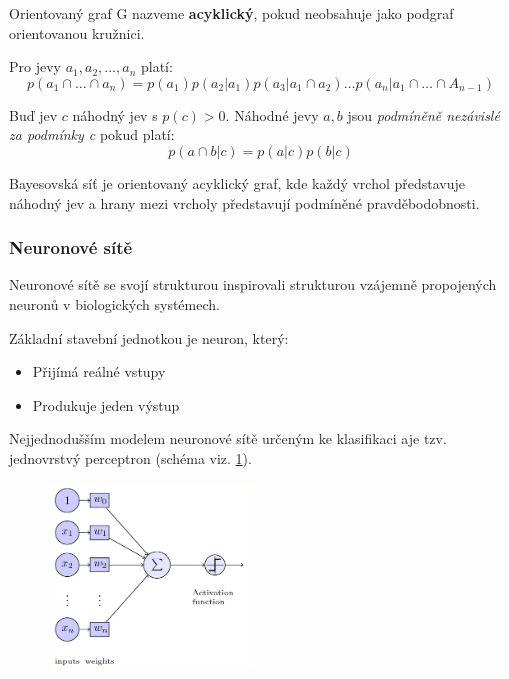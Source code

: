 \begin{definition}
    Orientovaný graf G nazveme \textbf{acyklický}, pokud neobsahuje jako podgraf orientovanou kružnici.
    \end{definition}

    \begin{lemma}
        Pro jevy $a_1, a_2, \hdots, a_n$ platí: 
        $$p(a_1 \cap \hdots \cap a_n) = p(a_1)p(a_2|a_1)p(a_3|a_1 \cap a_2)\hdots p(a_n| a_1 \cap \hdots \cap A_{n-1}) $$
        \end{lemma}

        \begin{definition}
            Buď jev $c$ náhodný jev s $p(c) > 0 $. Náhodné jevy $a, b$ jsou \textit{podmíněně nezávislé za podmínky c} pokud platí: 
            $$p(a \cap b|c) = p(a|c)p(b|c)$$
            \end{definition}
Bayesovská síť je  orientovaný acyklický graf, kde každý vrchol představuje náhodný jev a hrany mezi vrcholy představují podmíněné pravděbodobnosti. 

\subsubsection{Neuronové sítě}
Neuronové sítě se svojí strukturou inspirovali strukturou vzájemně propojených neuronů v biologických systémech. 

Základní stavební jednotkou je neuron, který:
\begin{itemize}
    \item Přijímá reálné vstupy
    \item Produkuje jeden výstup
\end{itemize}

Nejjednodušším modelem neuronové sítě určeným ke klasifikaci aje tzv. jednovrstvý perceptron (schéma viz. \ref*{fig:perceptron}).

\begin{figure}[h]
    \centering
    \includegraphics[height=5cm]{text/img/pereptron.PNG}
    \caption{}
    \label{fig:perceptron}
\end{figure}

